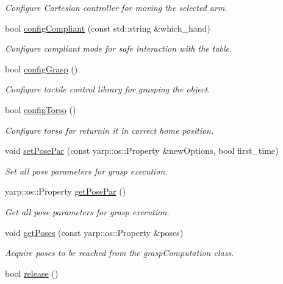 \begin{DoxyCompactItemize}
\begin{DoxyCompactList}\small\item\em Configure Cartesian controller for moving the selected arm. \end{DoxyCompactList}\item 
bool \hyperlink{classGraspExecution_a7196ae9f61b3914be283214ac8e482e9}{config\+Compliant} (const std\+::string \&which\+\_\+hand)
\begin{DoxyCompactList}\small\item\em Configure compliant mode for safe interaction with the table. \end{DoxyCompactList}\item 
bool \hyperlink{classGraspExecution_a574cbbf59e8eb5a5c241a7f74fbfc416}{config\+Grasp} ()
\begin{DoxyCompactList}\small\item\em Configure tactile control library for grasping the object. \end{DoxyCompactList}\item 
bool \hyperlink{classGraspExecution_a6baa49c059f0d6ecf5ee0f7fd70c53f2}{config\+Torso} ()
\begin{DoxyCompactList}\small\item\em Configure torso for returnin it in correct home position. \end{DoxyCompactList}\item 
void \hyperlink{classGraspExecution_a97ba4b07275190fbe6a6c1a72955e937}{set\+Pose\+Par} (const yarp\+::os\+::\+Property \&new\+Options, bool first\+\_\+time)
\begin{DoxyCompactList}\small\item\em Set all pose parameters for grasp execution. \end{DoxyCompactList}\item 
yarp\+::os\+::\+Property \hyperlink{classGraspExecution_a52376a3e84d6b4bd90ea25a8611c49da}{get\+Pose\+Par} ()
\begin{DoxyCompactList}\small\item\em Get all pose parameters for grasp execution. \end{DoxyCompactList}\item 
void \hyperlink{classGraspExecution_adfd05fa913582df6bfaaa80ec941f468}{get\+Poses} (const yarp\+::os\+::\+Property \&poses)
\begin{DoxyCompactList}\small\item\em Acquire poses to be reached from the grasp\+Computation class. \end{DoxyCompactList}\item 
bool \hyperlink{classGraspExecution_a83b790d2e2522e333346044baec1573c}{release} ()\label{classGraspExecution_a83b790d2e2522e333346044baec1573c}


\end{DoxyCompactItemize}
